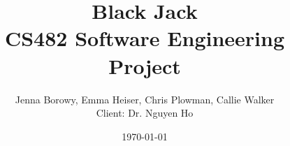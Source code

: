 \documentclass[12pt]{article} %
\title{Black Jack\\
CS482 Software Engineering Project}
\author{Jenna Borowy, Emma Heiser, Chris Plowman, Callie Walker\\
Client: Dr. Nguyen Ho}
\date{\today}
\begin{document}
\maketitle

\pagebreak
\tableofcontents


\pagebreak








 




%
\end{document}
